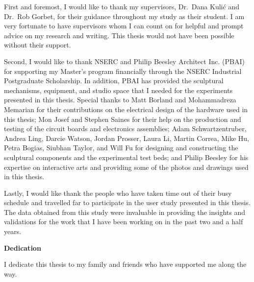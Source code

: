First and foremost, I would like to thank my supervisors, Dr.~Dana Kuli\'{c} and Dr.~Rob Gorbet, for their guidance throughout my study as their student. I am very fortunate to have supervisors whom I can count on for helpful and prompt advice on my research and writing. This thesis would not have been possible without their support. 

Second, I would like to thank NSERC and Philip Beesley Architect Inc. (PBAI) for supporting my Master's program financially through the NSERC Industrial Postgraduate Scholarship. In addition, PBAI has provided the sculptural mechanisms, equipment, and studio space that I needed for the experiments presented in this thesis. Special thanks to Matt Borland and Mohammadreza Memarian for their contributions on the electrical design of the hardware used in this thesis; Mon Josef and Stephen Saines for their help on the production and testing of the circuit boards and electronics assemblies; Adam Schwartzentruber, Andrea Ling, Darcie Watson, Jordan Prosser, Laura Li, Martin Correa, Mike Hu, Petra Bogias, Siubhan Taylor, and Will Fu for designing and constructing the sculptural components and the experimental test beds; and Philip Beesley for his expertise on interactive arts and providing some of the photos and drawings used in this thesis. 

Lastly, I would like thank the people who have taken time out of their busy schedule and travelled far to participate in the user study presented in this thesis. The data obtained from this study were invaluable in providing the insights and validations for the work that I have been working on in the past two and a half years. 





\cleardoublepage


\begin{center}\textbf{Dedication}\end{center}

I dedicate this thesis to my family and friends who have supported me along the way.

\cleardoublepage

\renewcommand\contentsname{Table of Contents}
\tableofcontents
\cleardoublepage
{}

\listoftables
\cleardoublepage
{}		%


